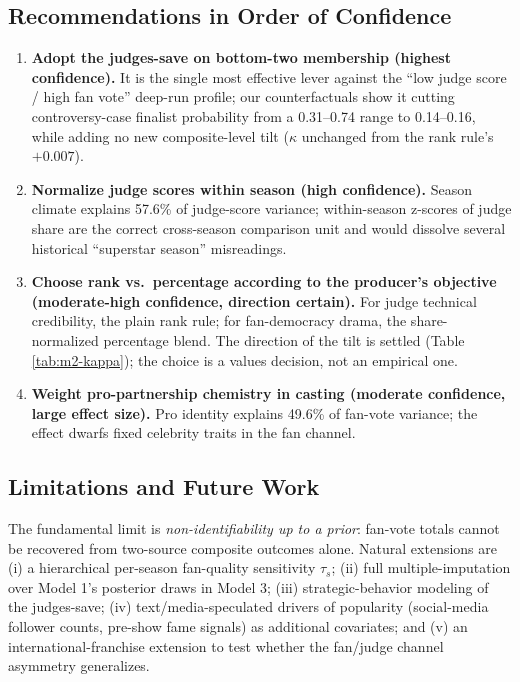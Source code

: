 \documentclass{article}
\begin{document}
\subsection{Recommendations in Order of Confidence}

\begin{enumerate}
  \item \textbf{Adopt the judges-save on bottom-two membership (highest confidence).} It is the single most effective lever against the ``low judge score / high fan vote'' deep-run profile; our counterfactuals show it cutting controversy-case finalist probability from a 0.31--0.74 range to 0.14--0.16, while adding no new composite-level tilt ($\kappa$ unchanged from the rank rule's $+0.007$).
  \item \textbf{Normalize judge scores within season (high confidence).} Season climate explains 57.6\% of judge-score variance; within-season z-scores of judge share are the correct cross-season comparison unit and would dissolve several historical ``superstar season'' misreadings.
  \item \textbf{Choose rank vs.\ percentage according to the producer's objective (moderate-high confidence, direction certain).} For judge technical credibility, the plain rank rule; for fan-democracy drama, the share-normalized percentage blend. The direction of the tilt is settled (Table \ref{tab:m2-kappa}); the choice is a values decision, not an empirical one.
  \item \textbf{Weight pro-partnership chemistry in casting (moderate confidence, large effect size).} Pro identity explains 49.6\% of fan-vote variance; the effect dwarfs fixed celebrity traits in the fan channel.
\end{enumerate}

\subsection{Limitations and Future Work}

The fundamental limit is \emph{non-identifiability up to a prior}: fan-vote totals cannot be recovered from two-source composite outcomes alone. Natural extensions are (i) a hierarchical per-season fan-quality sensitivity $\tau_s$; (ii) full multiple-imputation over Model 1's posterior draws in Model 3; (iii) strategic-behavior modeling of the judges-save; (iv) text/media-speculated drivers of popularity (social-media follower counts, pre-show fame signals) as additional covariates; and (v) an international-franchise extension to test whether the fan/judge channel asymmetry generalizes.
\end{document}
